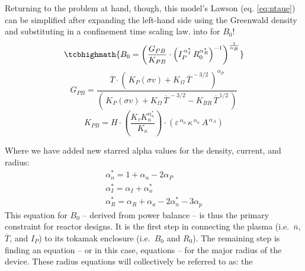Returning to the problem at hand, though, this model's Lawson  (eq. \ref{eq:ntaue}) can be simplified after expanding the left-hand side using the Greenwald density and substituting in a confinement time scaling law.  into  for $B_0$!
\begin{equation}
	\label{eq:b_0_power}
	\tcbhighmath{
	B_0 = \left( \frac{ G_{PB} }{ K_{PB} } \cdot \left( I_P^{\,\alpha_I^*} \, R_0^{ \alpha_R^* } \right)^{-1} \right) ^ { \frac{1}{ \alpha_B } }
	}
\end{equation}
\begin{equation}
	G_{PB} = \frac{ \overline{T} \cdot \left( \, K_P (\sigma v) + K_\Omega  \, \overline{T}^{  \,-3/2 } \, \right) ^ { \alpha_P } }{ \left( \, K_P (\sigma v) + K_\Omega  \, \overline{T}^{  \,-3/2 } - K_{BR} \, \overline{T}^{  \,1/2 } \, \right) }
\end{equation}
\begin{equation}
	K_{PB} = H \cdot \left( \frac{ K_\tau K_n^{\alpha_n^*}}{K_\kappa } \right) \cdot \left(
     \varepsilon^{\,\alpha_a} \, \kappa^{\,\alpha_\kappa} \, A^{\,\alpha_A}\right)
\end{equation}

Where we have added new starred alpha values for the density, current, and radius:
\begin{gather}
  \alpha_n^* = 1 + \alpha_n - 2 \alpha_P \\
  \alpha_I^* = \alpha_I + \alpha_n^* \\
  \alpha_R^* = \alpha_R + \alpha_a - 2  \alpha_n^* - 3 \alpha_p
\end{gather}
This equation for $B_0$ -- derived from power balance -- is thus the primary constraint for reactor designs. It is the first step in connecting the plasma (i.e.\ $\overline n$, $\overline T$, and $I_P$) to its tokamak enclosure (i.e.\ $B_0$ and $R_0$). The remaining step is finding an equation -- or in this case, equations -- for the major radius of the device. These radius equations will collectively be referred to as: the 

